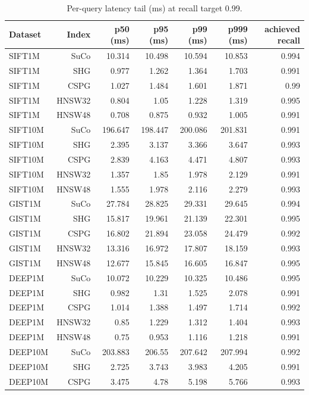 \begin{table}[t]
\centering
\small
\caption{Per-query latency tail (ms) at recall target 0.99.}
\label{tab:latency-tail-r99}
\begin{tabular}{lrrrrrr}
\toprule
Dataset & Index & p50 (ms) & p95 (ms) & p99 (ms) & p999 (ms) & achieved recall \\
\midrule
SIFT1M & SuCo & 10.314 & 10.498 & 10.594 & 10.853 & 0.994 \\
SIFT1M & SHG & 0.977 & 1.262 & 1.364 & 1.703 & 0.991 \\
SIFT1M & CSPG & 1.027 & 1.484 & 1.601 & 1.871 & 0.99 \\
SIFT1M & HNSW32 & 0.804 & 1.05 & 1.228 & 1.319 & 0.995 \\
SIFT1M & HNSW48 & 0.708 & 0.875 & 0.932 & 1.005 & 0.991 \\
SIFT10M & SuCo & 196.647 & 198.447 & 200.086 & 201.831 & 0.991 \\
SIFT10M & SHG & 2.395 & 3.137 & 3.366 & 3.647 & 0.993 \\
SIFT10M & CSPG & 2.839 & 4.163 & 4.471 & 4.807 & 0.993 \\
SIFT10M & HNSW32 & 1.357 & 1.85 & 1.978 & 2.129 & 0.991 \\
SIFT10M & HNSW48 & 1.555 & 1.978 & 2.116 & 2.279 & 0.993 \\
GIST1M & SuCo & 27.784 & 28.825 & 29.331 & 29.645 & 0.994 \\
GIST1M & SHG & 15.817 & 19.961 & 21.139 & 22.301 & 0.995 \\
GIST1M & CSPG & 16.802 & 21.894 & 23.058 & 24.479 & 0.992 \\
GIST1M & HNSW32 & 13.316 & 16.972 & 17.807 & 18.159 & 0.993 \\
GIST1M & HNSW48 & 12.677 & 15.845 & 16.605 & 16.847 & 0.995 \\
DEEP1M & SuCo & 10.072 & 10.229 & 10.325 & 10.486 & 0.995 \\
DEEP1M & SHG & 0.982 & 1.31 & 1.525 & 2.078 & 0.991 \\
DEEP1M & CSPG & 1.014 & 1.388 & 1.497 & 1.714 & 0.992 \\
DEEP1M & HNSW32 & 0.85 & 1.229 & 1.312 & 1.404 & 0.993 \\
DEEP1M & HNSW48 & 0.75 & 0.953 & 1.116 & 1.218 & 0.991 \\
DEEP10M & SuCo & 203.883 & 206.55 & 207.642 & 207.994 & 0.992 \\
DEEP10M & SHG & 2.725 & 3.743 & 3.983 & 4.205 & 0.991 \\
DEEP10M & CSPG & 3.475 & 4.78 & 5.198 & 5.766 & 0.993 \\

\end{tabular}
\end{table}
